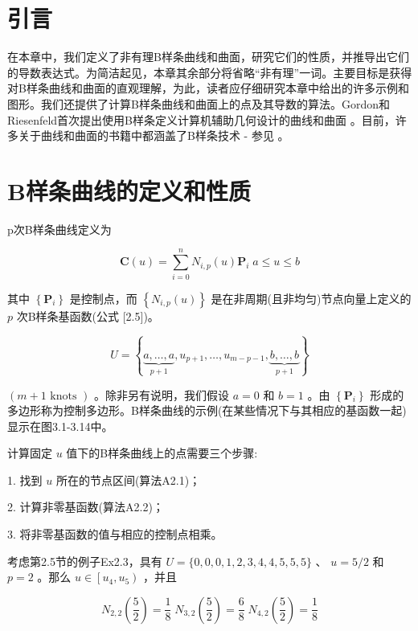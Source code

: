 \documentclass[../main.tex]{subfiles}
\begin{document}
\section{引言}

在本章中，我们定义了非有理B样条曲线和曲面，研究它们的性质，并推导出它们的导数表达式。为简洁起见，本章其余部分将省略“非有理”一词。主要目标是获得对B样条曲线和曲面的直观理解，为此，读者应仔细研究本章中给出的许多示例和图形。我们还提供了计算B样条曲线和曲面上的点及其导数的算法。Gordon和Riesenfeld首次提出使用B样条定义计算机辅助几何设计的曲线和曲面 \cite{Gord74b,Ries73}。目前，许多关于曲线和曲面的书籍中都涵盖了B样条技术 - 参见 \cite{DeBo78,Mort85,Bart87,Fari93,Yama88,Hosc93,Su89,Roge90,Beac91}。



\section{B样条曲线的定义和性质}

p次B样条曲线定义为

\[
\mathbf{C}\left( u\right)  = \mathop{\sum }\limits_{{i = 0}}^{n}{N}_{i,p}\left( u\right) {\mathbf{P}}_{i}\;a \leq  u \leq  b \tag{3.1}
\]

其中 \(\left\{  {\mathbf{P}}_{i}\right\}\) 是控制点，而 \(\left\{  {{N}_{i,p}\left( u\right) }\right\}\) 是在非周期(且非均匀)节点向量上定义的 \(p\) 次B样条基函数(公式 [2.5])。

\[
U = \left\{  {\underset{p + 1}{\underbrace{a,\ldots ,a}},{u}_{p + 1},\ldots ,{u}_{m - p - 1},\underset{p + 1}{\underbrace{b,\ldots ,b}}}\right\}
\]

\(\left( {m + 1\text{ knots }}\right)\) 。除非另有说明，我们假设 \(a = 0\) 和 \(b = 1\) 。由 \(\left\{  {\mathbf{P}}_{i}\right\}\) 形成的多边形称为控制多边形。B样条曲线的示例(在某些情况下与其相应的基函数一起)显示在图3.1-3.14中。

计算固定 \(u\) 值下的B样条曲线上的点需要三个步骤:

1. 找到 \(u\) 所在的节点区间(算法A2.1)；

2. 计算非零基函数(算法A2.2)；

3. 将非零基函数的值与相应的控制点相乘。

考虑第2.5节的例子Ex2.3，具有 \(U = \{ 0,0,0,1,2,3,4,4,5,5,5\}\) 、 \(u = 5/2\) 和 \(p = 2\) 。那么 \(u \in  \left\lbrack  {{u}_{4},{u}_{5}}\right)\) ，并且

\[
{N}_{2,2}\left( \frac{5}{2}\right)  = \frac{1}{8}\;{N}_{3,2}\left( \frac{5}{2}\right)  = \frac{6}{8}\;{N}_{4,2}\left( \frac{5}{2}\right)  = \frac{1}{8}
\]
\end{document}
